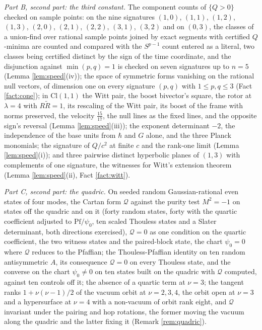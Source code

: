 \documentclass[11pt]{article}
\theoremstyle{definition}
\newcommand{\Cl}{\mathrm{Cl}}
\begin{document}
\emph{Part B, second part: the third constant.} The component counts of $\{Q > 0\}$ checked on sample points: on the nine signatures $(1,0)$, $(1,1)$, $(1,2)$, $(1,3)$, $(2,0)$, $(2,1)$, $(2,2)$, $(3,1)$, $(3,2)$ and on $(0,3)$, the classes of a union-find over rational sample points joined by exact segments with certified $Q$-minima are counted and compared with the $S^{p-1}$ count entered as a literal, two classes being certified distinct by the sign of the time coordinate, and the disjunction against $\min(p,q) = 1$ is checked on seven signatures up to $n = 5$ (Lemma \ref{lem:speed}(iv)); the space of symmetric forms vanishing on the rational null vectors, of dimension one on every signature $(p,q)$ with $1 \leq p, q \leq 3$ (Fact \ref{fact:cone}); in $\Cl(1,1)$ the Witt pair, the boost bivector's square, the rotor at $\lambda = 4$ with $R\tilde{R} = 1$, its rescaling of the Witt pair, its boost of the frame with norms preserved, the velocity $\tfrac{15}{17}$, the null lines as the fixed lines, and the opposite sign's reversal (Lemma \ref{lem:speed}(iii)); the exponent determinant $-2$, the independence of the base units from $\hbar$ and $G$ alone, and the three Planck monomials; the signature of $Q/c^{2}$ at finite $c$ and the rank-one limit (Lemma \ref{lem:speed}(i)); and three pairwise distinct hyperbolic planes of $(1,3)$ with complements of one signature, the witnesses for Witt's extension theorem (Lemma \ref{lem:speed}(ii), Fact \ref{fact:witt}).

\emph{Part C, second part: the quadric.} On seeded random Gaussian-rational even states of four modes, the Cartan form $\mathcal{Q}$ against the purity test $M^{2} = -1$ on states off the quadric and on it (forty random states, forty with the quartic coefficient adjusted to $\mathrm{Pf}/\psi_{0}$, ten scaled Thouless states and a Slater determinant, both directions exercised), $\mathcal{Q} = 0$ as one condition on the quartic coefficient, the two witness states and the paired-block state, the chart $\psi_{0} = 0$ where $\mathcal{Q}$ reduces to the Pfaffian; the Thouless-Pfaffian identity on ten random antisymmetric $A$, its consequence $\mathcal{Q} = 0$ on every Thouless state, and the converse on the chart $\psi_{0} \neq 0$ on ten states built on the quadric with $\mathcal{Q}$ computed, against ten controls off it; the absence of a quartic term at $\nu = 3$; the tangent ranks $1 + \nu(\nu-1)/2$ of the vacuum orbit at $\nu = 2, 3, 4$, the orbit open at $\nu = 3$ and a hypersurface at $\nu = 4$ with a non-vacuum of orbit rank eight, and $\mathcal{Q}$ invariant under the pairing and hop rotations, the former moving the vacuum along the quadric and the latter fixing it (Remark \ref{rem:quadric}).
\end{document}
